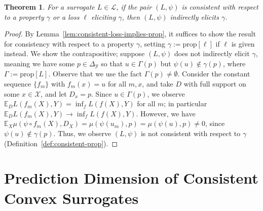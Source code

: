 \documentclass{article}
\newcommand{\Comments}{1}
\newcommand{\mynote}[2]{\ifnum\Comments=1\textcolor{#1}{#2}\fi}
\newcommand{\mytodo}[2]{\ifnum\Comments=1%
	\todo[linecolor=#1!80!black,backgroundcolor=#1,bordercolor=#1!80!black]{#2}\fi}
\newcommand{\raft}[1]{\mytodo{green!20!white}{RF: #1}}
\newcommand{\jessie}[1]{\mynote{purple}{[JF: #1]}}
\newcommand{\simplex}{\Delta_\Y}
\newcommand{\prop}[1]{\mathrm{prop}[#1]}
\newcommand{\propdis}{\mu}
\newcommand{\E}{\mathbb{E}}
\renewcommand{\L}{\mathcal{L}}
\newcommand{\X}{\mathcal{X}}
\newcommand{\Y}{\mathcal{Y}}
\newtheorem{theorem}{Theorem}
\begin{document}
\begin{theorem}\label{thm:consistent-implies-indir-elic}
	For a surrogate $L \in \L$, if the pair $(L, \psi)$ is consistent with respect to a property $\gamma$ or a loss $\ell$ eliciting $\gamma$, then $(L, \psi)$ indirectly elicits $\gamma$.
\end{theorem}
\begin{proof}
	By Lemma~\ref{lem:consistent-loss-implies-prop}, it suffices to show the result for consistency with respect to a property $\gamma$, setting $\gamma := \prop{\ell}$ if $\ell$ is given instead.
	We show the contrapositive; suppose $(L, \psi)$ does not indirectly elicit $\gamma$, meaning we have some $p \in \simplex$ so that $u \in \Gamma(p)$ but $\psi(u) \not \in \gamma(p)$, where $\Gamma := \prop{L}$.
	Observe that we use the fact $\Gamma(p) \neq \emptyset$.
	Consider the constant sequence $\{f_m\}$ with $f_m(x) = u$ for all $m,x$, and take $D$ with full support on some $x \in \X$, and let $D_x = p$.
  Since $u \in \Gamma(p)$, we observe $\E_D L(f_m(X), Y) = \inf_f L(f(X),Y)$ for all $m$; in particular $\E_D L(f_m(X), Y) \to \inf_f L(f(X),Y)$.
	However, we have $\E_X \propdis(\psi \circ f_m(X), D_X) = \propdis(\psi(u_m), p) = \propdis(\psi(u), p) \neq 0$, since $\psi(u) \not \in \gamma(p)$.
	Thus, we observe $(L, \psi)$ is not consistent with respect to $\gamma$ (Definition~\ref{def:consistent-prop}).
\end{proof}

\section{Prediction Dimension of Consistent Convex Surrogates}\label{sec:char-convex}
\end{document}
